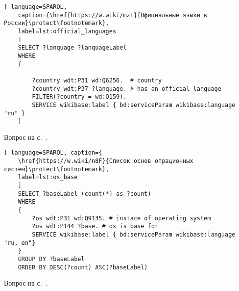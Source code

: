 \begin{task}
	\label{answer:official_language}
	
	\begin{lstlisting}[ language=SPARQL, 
	caption={\href{https://w.wiki/mzF}{Официальные языки в России}\protect\footnotemark},
	label=lst:official_languages
	]
	SELECT ?lanquage ?lanquageLabel
	WHERE
	{
	
		?country wdt:P31 wd:Q6256.  # country
		?country wdt:P37 ?lanquage. # has an official language
		FILTER(?country = wd:Q159). 
		SERVICE wikibase:label { bd:serviceParam wikibase:language "ru" }
	}
	\end{lstlisting}
	
	\small{Вопрос на с.~\pageref{lst:without_inception}.}
\end{task}


\begin{task}
	\label{answer:os_base}
	
	\begin{lstlisting}[ language=SPARQL, caption={
	\href{https://w.wiki/n8F}{Список основ опрационных систем}\protect\footnotemark},
	label=lst:os_base
	]
	SELECT ?baseLabel (count(*) as ?count)
	WHERE
	{
		?os wdt:P31 wd:Q9135. # instace of operating system
		?os wdt:P144 ?base. # os is base for
		SERVICE wikibase:label { bd:serviceParam wikibase:language "ru, en"}
	}
	GROUP BY ?baseLabel
	ORDER BY DESC(?count) ASC(?baseLabel)
	\end{lstlisting}
	
	\small{Вопрос на с.~\pageref{lst:base_of_operating_systems}.}
\end{task}

